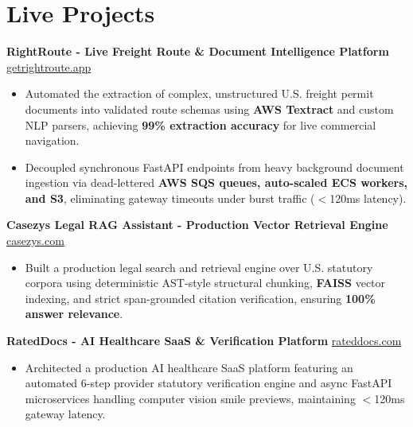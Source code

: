 \documentclass[9.5pt,a4paper]{article}
\begin{document}
\section*{Live Projects}
\noindent
\textbf{RightRoute - Live Freight Route \& Document Intelligence Platform} \hfill \href{https://getrightroute.app}{getrightroute.app}
\begin{itemize}
    \item Automated the extraction of complex, unstructured U.S. freight permit documents into validated route schemas using \textbf{AWS Textract} and custom NLP parsers, achieving \textbf{99\% extraction accuracy} for live commercial navigation.
    \item Decoupled synchronous FastAPI endpoints from heavy background document ingestion via dead-lettered \textbf{AWS SQS queues, auto-scaled ECS workers, and S3}, eliminating gateway timeouts under burst traffic ($<$120ms latency).
\end{itemize}
\vspace{0.6pt}
\noindent
\textbf{Casezys Legal RAG Assistant - Production Vector Retrieval Engine} \hfill \href{https://casezys.com}{casezys.com}
\begin{itemize}
    \item Built a production legal search and retrieval engine over U.S. statutory corpora using deterministic AST-style structural chunking, \textbf{FAISS} vector indexing, and strict span-grounded citation verification, ensuring \textbf{100\% answer relevance}.
\end{itemize}
\vspace{0.6pt}
\noindent
\textbf{RatedDocs - AI Healthcare SaaS \& Verification Platform} \hfill \href{https://rateddocs.com}{rateddocs.com}
\begin{itemize}
    \item Architected a production AI healthcare SaaS platform featuring an automated 6-step provider statutory verification engine and async FastAPI microservices handling computer vision smile previews, maintaining $<$120ms gateway latency.
\end{itemize}
\vspace{0.6pt}
\end{document}
